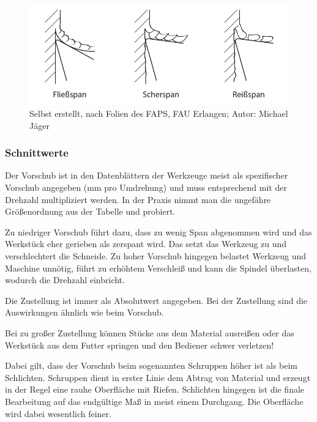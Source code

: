 \documentclass{\basedir/fablab-document}
\begin{document}
\begin{figure}[ht]
\centering
\includegraphics[width = \linewidth]{img/spanformen}
\caption{Selbst erstellt, nach Folien des FAPS, FAU Erlangen; Autor: Michael Jäger}
\end{figure}

\subsubsection{Schnittwerte}
\label{Schnittwerte}
Der Vorschub ist in den Datenblättern der Werkzeuge meist als spezifischer Vorschub angegeben (mm pro Umdrehung) und muss entsprechend mit der Drehzahl multipliziert werden.
In der Praxis nimmt man die ungefähre Größenordnung aus der Tabelle und probiert.

Zu niedriger Vorschub führt dazu, dass zu wenig Span abgenommen wird und das Werkstück eher gerieben als zerspant wird.
Das setzt das Werkzeug zu und verschlechtert die Schneide.
Zu hoher Vorschub hingegen belastet Werkzeug und Maschine unnötig,
führt zu erhöhtem Verschleiß und kann die Spindel überlasten, wodurch die Drehzahl einbricht.

Die Zustellung ist immer als Absolutwert angegeben.
Bei der Zustellung sind die Auswirkungen ähnlich wie beim Vorschub.

Bei zu großer Zustellung können Stücke aus dem Material ausreißen oder das Werkstück aus dem Futter
springen und den Bediener schwer verletzen!

Dabei gilt, dass der Vorschub beim sogenannten Schruppen höher ist als beim Schlichten.
Schruppen dient in erster Linie dem Abtrag von Material und erzeugt in der Regel eine rauhe Oberfläche mit Riefen.
Schlichten hingegen ist die finale Bearbeitung auf das endgültige Maß in meist einem Durchgang.
Die Oberfläche wird dabei wesentlich feiner. 
\end{document}
